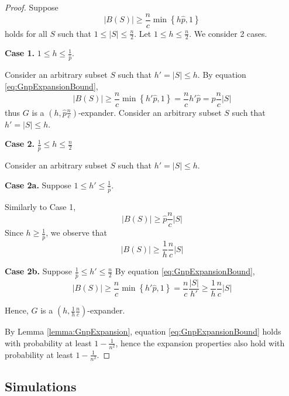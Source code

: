 \begin{proof}
	Suppose 
	\begin{equation}\label{eq:GnpExpansionBound}
		|B(S)| \geq \frac{n}{c} \min \left\{ h \hat{p}, 1 \right\} 
	\end{equation}
	holds for all $S$ such that $1 \leq |S| \leq \frac{n}{2}$. 
	Let $1 \leq h \leq \frac{n}{2}$. We consider 2 cases. 

	\textbf{Case 1.} $1 \leq h \leq \frac{1}{\hat{p}}$. 

	Consider an arbitrary subset $S$ such that $h' = |S| \leq h$.
	By equation \ref{eq:GnpExpansionBound}, 
	$$
		|B(S)| \geq \frac{n}{c} \min \left\{ h' \hat{p}, 1 \right\} = \frac{n}{c}h'\hat{p} = \hat{p}\frac{n}{c} |S|
	$$
	thus $G$ is a $(h, \hat{p}\frac{n}{c})$-expander.
	Consider an arbitrary subset $S$ such that $h' = |S| \leq h$. 

	\textbf{Case 2.} $\frac{1}{\hat{p}} \leq h \leq \frac{n}{2}$

	Consider an arbitrary subset $S$ such that $h' = |S| \leq h$.

	\textbf{Case 2a.}
	Suppose $1 \leq h' \leq \frac{1}{\hat{p}}$. 
	
	Similarly to Case 1, 
	$$
		|B(S)| \geq \hat{p}\frac{n}{c} |S|
	$$
	Since $h \geq \frac{1}{\hat{p}}$, we observe that 
	$$
		|B(S)| \geq \frac{1}{h}  \frac{n}{c} |S|
	$$ 

	\textbf{Case 2b.} Suppose $\frac{1}{\hat{p}} \leq h' \leq \frac{n}{2}$
	By equation \ref{eq:GnpExpansionBound}, 
	$$
		|B(S)| 
		\geq \frac{n}{c} \min \left\{ h' \hat{p}, 1 \right\} 
		= \frac{n}{c}\frac{|S|}{h'} 
		\geq \frac{1}{h} \frac{n}{c}|S|
	$$

	Hence, $G$ is a $(h, \frac{1}{h} \frac{n}{c})$-expander.

	By Lemma \ref{lemma:GnpExpansion}, equation \ref{eq:GnpExpansionBound} holds with probability at least $1 - \frac{1}{n^2}$, hence the expansion properties also hold with probability at least $1 - \frac{1}{n^2}$.
\end{proof}


\subsection{Simulations}

